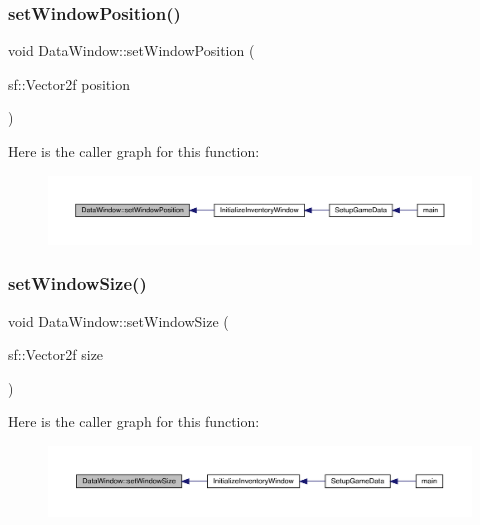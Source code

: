 \subsubsection{\texorpdfstring{set\+Window\+Position()}{setWindowPosition()}}
{\footnotesize\ttfamily void Data\+Window\+::set\+Window\+Position (\begin{DoxyParamCaption}\item[{sf\+::\+Vector2f}]{position }\end{DoxyParamCaption})}

Here is the caller graph for this function\+:
\nopagebreak
\begin{figure}[H]
\begin{center}
\leavevmode
\includegraphics[width=350pt]{class_data_window_ab28e270817e9cdc56c78d9723c485d8f_icgraph}
\end{center}
\end{figure}
\mbox{\label{class_data_window_af883ff10816a9ad49b7b794c3e9f8f92}} 
\subsubsection{\texorpdfstring{set\+Window\+Size()}{setWindowSize()}}
{\footnotesize\ttfamily void Data\+Window\+::set\+Window\+Size (\begin{DoxyParamCaption}\item[{sf\+::\+Vector2f}]{size }\end{DoxyParamCaption})}

Here is the caller graph for this function\+:
\nopagebreak
\begin{figure}[H]
\begin{center}
\leavevmode
\includegraphics[width=350pt]{class_data_window_af883ff10816a9ad49b7b794c3e9f8f92_icgraph}
\end{center}
\end{figure}
\mbox{\label{class_data_window_acd1f484d18f8f32d419d23e05e89ea31}} 
